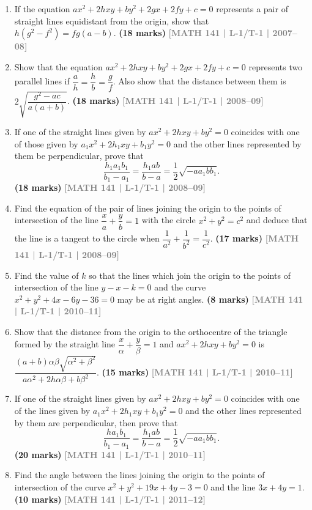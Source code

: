 \documentclass[12pt,a4paper]{article}
\newcommand{\yr}[1]{\hfill\textcolor{gray}{\small\textbf{[#1]}}}
\newcommand{\mk}[1]{\textcolor{orange!70!black}{\small\textbf{(#1 marks)}}}
\begin{document}
\begin{enumerate}
\item If the equation $ax^{2}+2hxy+by^{2}+2gx+2fy+c=0$ represents a pair of straight lines equidistant from the origin, show that $h(g^{2}-f^{2})=fg(a-b)$.
\mk{18} \yr{MATH 141 | L-1/T-1 | 2007--08}

\item Show that the equation $ax^{2}+2hxy+by^{2}+2gx+2fy+c=0$ represents two parallel lines if $\dfrac{a}{h}=\dfrac{h}{b}=\dfrac{g}{f}$. Also show that the distance between them is $2\sqrt{\dfrac{g^{2}-ac}{a(a+b)}}$.
\mk{18} \yr{MATH 141 | L-1/T-1 | 2008--09}

\item If one of the straight lines given by $ax^{2}+2hxy+by^{2}=0$ coincides with one of those given by $a_{1}x^{2}+2h_{1}xy+b_{1}y^{2}=0$ and the other lines represented by them be perpendicular, prove that
\[
\frac{h_{1}a_{1}b_{1}}{b_{1}-a_{1}}=\frac{h_{1}ab}{b-a}=\frac{1}{2}\sqrt{-aa_{1}bb_{1}}.
\]
\mk{18} \yr{MATH 141 | L-1/T-1 | 2008--09}

\item Find the equation of the pair of lines joining the origin to the points of intersection of the line $\dfrac{x}{a}+\dfrac{y}{b}=1$ with the circle $x^{2}+y^{2}=c^{2}$ and deduce that the line is a tangent to the circle when $\dfrac{1}{a^{2}}+\dfrac{1}{b^{2}}=\dfrac{1}{c^{2}}$.
\mk{17} \yr{MATH 141 | L-1/T-1 | 2008--09}

\item Find the value of $k$ so that the lines which join the origin to the points of intersection of the line $y-x-k=0$ and the curve $x^{2}+y^{2}+4x-6y-36=0$ may be at right angles.
\mk{8} \yr{MATH 141 | L-1/T-1 | 2010--11}

\item Show that the distance from the origin to the orthocentre of the triangle formed by the straight line $\dfrac{x}{\alpha}+\dfrac{y}{\beta}=1$ and $ax^{2}+2hxy+by^{2}=0$ is
$\dfrac{(a+b)\alpha\beta\sqrt{\alpha^{2}+\beta^{2}}}{a\alpha^{2}+2h\alpha\beta+b\beta^{2}}$.
\mk{15} \yr{MATH 141 | L-1/T-1 | 2010--11}

\item If one of the straight lines given by $ax^{2}+2hxy+by^{2}=0$ coincides with one of the lines given by $a_{1}x^{2}+2h_{1}xy+b_{1}y^{2}=0$ and the other lines represented by them are perpendicular, then prove that
\[
\frac{ha_{1}b_{1}}{b_{1}-a_{1}}=\frac{h_{1}ab}{b-a}=\frac{1}{2}\sqrt{-aa_{1}bb_{1}}.
\]
\mk{20} \yr{MATH 141 | L-1/T-1 | 2010--11}

\item Find the angle between the lines joining the origin to the points of intersection of the curve $x^{2}+y^{2}+19x+4y-3=0$ and the line $3x+4y=1$.
\mk{10} \yr{MATH 141 | L-1/T-1 | 2011--12}


\end{enumerate}
\end{document}
